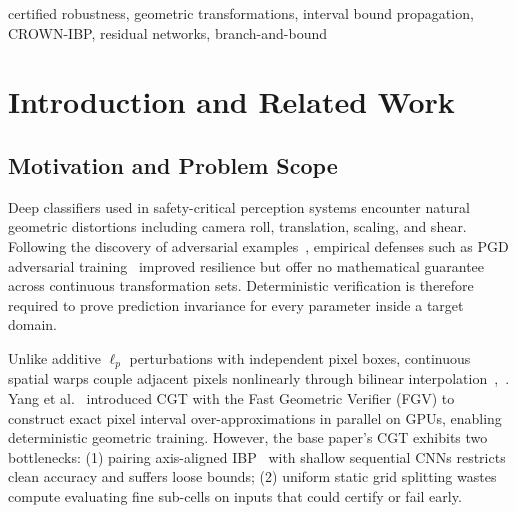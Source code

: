 \documentclass[conference]{IEEEtran}
\begin{document}
\begin{IEEEkeywords}
certified robustness, geometric transformations, interval bound propagation,
CROWN-IBP, residual networks, branch-and-bound
\end{IEEEkeywords}

\section{Introduction and Related Work}

\subsection{Motivation and Problem Scope}
Deep classifiers used in safety-critical perception systems encounter natural
geometric distortions including camera roll, translation, scaling, and shear.
Following the discovery of adversarial examples~\cite{b1}, empirical defenses
such as PGD adversarial training~\cite{b2} improved resilience but offer no
mathematical guarantee across continuous transformation sets.
Deterministic verification is therefore required to prove prediction invariance
for every parameter inside a target domain.

Unlike additive $\ell_p$ perturbations with independent pixel boxes, continuous
spatial warps couple adjacent pixels nonlinearly through bilinear
interpolation~\cite{b3},~\cite{b4}.
Yang et al.~\cite{b3} introduced CGT with the Fast Geometric Verifier (FGV)
to construct exact pixel interval over-approximations in parallel on GPUs,
enabling deterministic geometric training.
However, the base paper's CGT exhibits two bottlenecks: (1) pairing
axis-aligned IBP~\cite{b8} with shallow sequential CNNs restricts clean
accuracy and suffers loose bounds; (2) uniform static grid splitting wastes
compute evaluating fine sub-cells on inputs that could certify or fail early.
\end{document}
